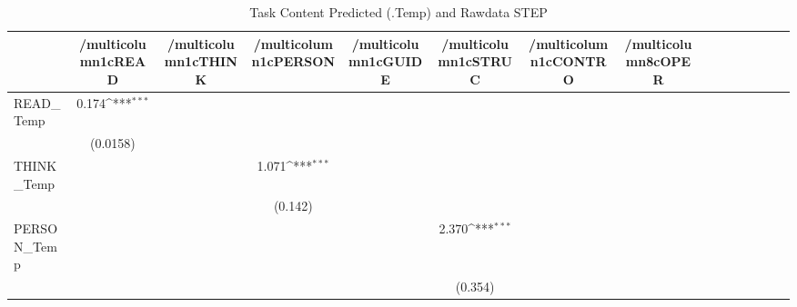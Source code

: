\begin{table}[htbp]\centering
\def\sym#1{\ifmmode^{#1}\else\(^{#1}\)\fi}
\caption{Task Content Predicted (.Temp) and Rawdata STEP}
\begin{tabular}{l*{14}{c}}
\hline\hline
            &/multicolumn{1}{c}{READ}&/multicolumn{1}{c}{THINK}&/multicolumn{1}{c}{PERSON}&/multicolumn{1}{c}{GUIDE}&/multicolumn{1}{c}{STRUC}&/multicolumn{1}{c}{CONTRO}&/multicolumn{8}{c}{OPER}                                                                                                                                                       \\
\hline
READ\_Temp   &       0.174\sym{***}&                     &                     &                     &                     &                     &                     &                     &                     &                     &                     &                     &                     &                     \\
            &    (0.0158)         &                     &                     &                     &                     &                     &                     &                     &                     &                     &                     &                     &                     &                     \\
[1em]
THINK\_Temp  &                     &                     &       1.071\sym{***}&                     &                     &                     &                     &                     &                     &                     &                     &                     &                     &                     \\
            &                     &                     &     (0.142)         &                     &                     &                     &                     &                     &                     &                     &                     &                     &                     &                     \\
[1em]
PERSON\_Temp &                     &                     &                     &                     &       2.370\sym{***}&                     &                     &                     &                     &                     &                     &                     &                     &                     \\
            &                     &                     &                     &                     &     (0.354)         &                     &                     &                     &                     &                     &                     &                     &                     &                     \\

\end{tabular}
\end{table}
